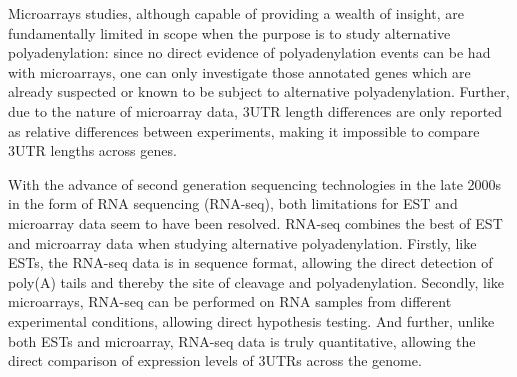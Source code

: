 Microarrays studies, although capable of providing a wealth of insight, are
fundamentally limited in scope when the purpose is to study alternative
polyadenylation: since no direct evidence of polyadenylation events can be had
with microarrays, one can only investigate those annotated genes which are
already suspected or known to be subject to alternative polyadenylation.
Further, due to the nature of microarray data, 3\p UTR length differences are
only reported as relative differences between experiments, making it impossible
to compare 3\p UTR lengths across genes.

With the advance of second generation sequencing technologies in the late 2000s
in the form of RNA sequencing (RNA-seq), both limitations for EST and
microarray data seem to have been resolved. RNA-seq combines the best of EST
and microarray data when studying alternative polyadenylation. Firstly, like
ESTs, the RNA-seq data is in sequence format, allowing the direct detection
of poly(A) tails and thereby the site of cleavage and polyadenylation.
Secondly, like microarrays, RNA-seq can be performed on RNA samples from
different experimental conditions, allowing direct hypothesis testing. And
further, unlike both ESTs and microarray, RNA-seq data is truly quantitative,
allowing the direct comparison of expression levels of 3\p UTRs across the
genome.

